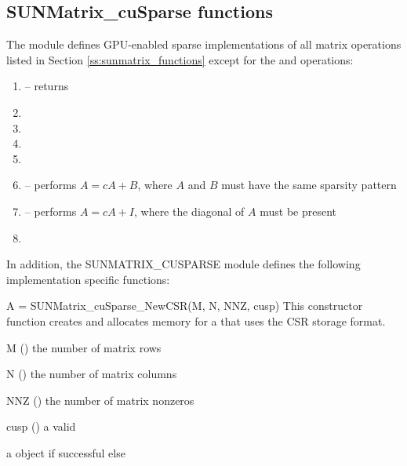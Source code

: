 \subsection{SUNMatrix\_cuSparse functions}
\label{ss:sunmat_cusparse_functions}

The  module defines GPU-enabled sparse implementations
of all matrix operations listed in Section
\ref{ss:sunmatrix_functions} except for the 
and  operations:

\begin{enumerate}
  \item {} -- returns 
  \item {}
  \item {}
  \item {}
  \item {}
  \item {} -- performs $A = cA + B$, where $A$ and $B$
    must have the same sparsity pattern
  \item {} -- performs $A = cA + I$, where the diagonal
    of $A$ must be present
  \item {}
\end{enumerate}


In addition, the SUNMATRIX\_CUSPARSE module defines the following implementation specific
functions:

{
  A = SUNMatrix\_cuSparse\_NewCSR(M, N, NNZ, cusp)
}
{
  This constructor function creates and allocates memory for a 
   that uses the CSR storage format.
}
{
  \begin{args}[cusp]
  \item[M] () the number of matrix rows
  \item[N] () the number of matrix columns
  \item[NNZ] () the number of matrix nonzeros
  \item[cusp] () a valid 
  \end{args}
}
{
  a  object if successful else 
}
{}

